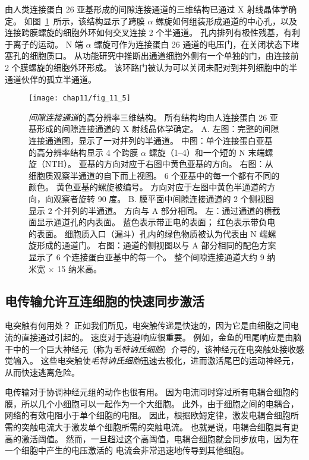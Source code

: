 由人类连接蛋白 26 亚基形成的间隙连接通道的三维结构已通过 X 射线晶体学确定。
如图~\ref{fig:11_5}~所示，该结构显示了跨膜 $\alpha$ 螺旋如何组装形成通道的中心孔，以及连接跨膜螺旋的细胞外环如何交叉连接 2 个半通道。
孔内排列有极性残基，有利于离子的运动。
N 端 $\alpha$ 螺旋可作为连接蛋白 26 通道的电压门，在关闭状态下堵塞孔的细胞质口。
从功能研究中推断出通道细胞外侧有一个单独的门，由连接前 2 个膜螺旋的细胞外环形成。
该环路门被认为可以关闭未配对到并列细胞中的半通道伙伴的孤立半通道。


\begin{figure}[htbp]
	\centering
	\texttt{[image: chap11/fig\_11\_5]}
	\caption{\textit{间隙连接通道}的高分辨率三维结构。
		所有结构均由人连接蛋白 26 亚基形成的间隙连接通道的 X 射线晶体学确定。
		A. 左图：完整的间隙连接通道图，显示了一对并列的半通道。
		中图：单个连接蛋白亚基的高分辨率结构显示 4 个跨膜 $\alpha$ 螺旋（1–4）和一个短的 N 末端螺旋（NTH）。
		亚基的方向对应于右图中黄色亚基的方向。
		右图：从细胞质观察半通道的自下而上视图。
		6 个亚基中的每一个都有不同的颜色。
		黄色亚基的螺旋被编号。
		方向对应于左图中黄色半通道的方向，向观察者旋转 90 度。
		B. 膜平面中间隙连接通道的 2 个侧视图显示 2 个并列的半通道。
		方向与 A 部分相同。
		左：通过通道的横截面显示通道孔的内表面。
		蓝色表示带正电的表面；
		红色表示带负电的表面。
		细胞质入口（漏斗）孔内的绿色物质被认为代表由 N 端螺旋形成的通道门。
		右图：通道的侧视图以与 A 部分相同的配色方案显示了 6 个连接蛋白亚基中的每一个。
		整个间隙连接通道大约 9 纳米宽 $\times$ 15 纳米高。}
	\label{fig:11_5}
\end{figure}


\subsection{电传输允许互连细胞的快速同步激活}

电突触有何用处？
正如我们所见，电突触传递是快速的，因为它是由细胞之间电流的直接通过引起的。
速度对于逃避响应很重要。
例如，金鱼的甩尾响应是由脑干中的一个巨大神经元（称为\textit{毛特讷氏细胞}）介导的，该神经元在电突触处接收感觉输入。
这些电突触使\textit{毛特讷氏细胞}迅速去极化，进而激活尾巴的运动神经元，从而快速逃离危险。


电传输对于协调神经元组的动作也很有用。
因为电流同时穿过所有电耦合细胞的膜，所以几个小细胞可以一起作为一个大细胞。
此外，由于细胞之间的电耦合，网络的有效电阻小于单个细胞的电阻。
因此，根据欧姆定律，激发电耦合细胞所需的突触电流大于激发单个细胞所需的突触电流。
也就是说，电耦合细胞具有更高的激活阈值。
然而，一旦超过这个高阈值，电耦合细胞就会同步放电，因为在一个细胞中产生的电压激活的  电流会非常迅速地传导到其他细胞。


